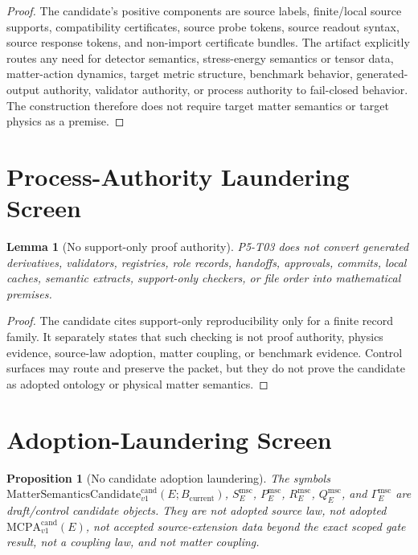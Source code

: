 \documentclass[11pt]{article}
\newcommand{\MCPA}{\mathrm{MCPA}^{\mathrm{cand}}_{v1}}
\newcommand{\Bcur}{B_{\mathrm{current}}}
\newcommand{\MSCand}{\mathrm{MatterSemanticsCandidate}^{\mathrm{cand}}_{v1}}
\newtheorem{lemma}{Lemma}
\newtheorem{proposition}{Proposition}
\begin{document}
\begin{proof}
The candidate's positive components are source labels, finite/local source
supports, compatibility certificates, source probe tokens, source readout
syntax, source response tokens, and non-import certificate bundles. The
artifact explicitly routes any need for detector semantics, stress-energy
semantics or tensor data, matter-action dynamics, target metric structure,
benchmark behavior, generated-output authority, validator authority, or
process authority to fail-closed behavior. The construction therefore does not
require target matter semantics or target physics as a premise.
\end{proof}

\section{Process-Authority Laundering Screen}

\begin{lemma}[No support-only proof authority]
P5-T03 does not convert generated derivatives, validators, registries, role
records, handoffs, approvals, commits, local caches, semantic extracts,
support-only checkers, or file order into mathematical premises.
\end{lemma}

\begin{proof}
The candidate cites support-only reproducibility only for a finite record
family. It separately states that such checking is not proof authority,
physics evidence, source-law adoption, matter coupling, or benchmark evidence.
Control surfaces may route and preserve the packet, but they do not prove the
candidate as adopted ontology or physical matter semantics.
\end{proof}

\section{Adoption-Laundering Screen}

\begin{proposition}[No candidate adoption laundering]
The symbols \(\MSCand(E;\Bcur)\), \(S_E^{\mathrm{msc}}\),
\(P_E^{\mathrm{msc}}\), \(R_E^{\mathrm{msc}}\),
\(Q_E^{\mathrm{msc}}\), and \(\Gamma_E^{\mathrm{msc}}\) are draft/control
candidate objects. They are not adopted source law, not adopted
\(\MCPA(E)\), not accepted source-extension data beyond the exact scoped gate
result, not a coupling law, and not matter coupling.
\end{proposition}
\end{document}
